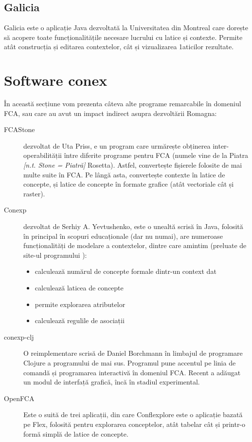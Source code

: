 \documentclass[12pt, a4paper, twoside, romanian]{teza-upb}
\begin{document}
    \subsection{Galicia}
      Galicia este o aplicație Java dezvoltată la Universitatea din Montreal care dorește să acopere toate funcționalitățile necesare lucrului cu latice și contexte. Permite atât construcția și editarea contextelor, cât și vizualizarea 1aticilor rezultate.
  \section{Software conex}

    În această secțiune vom prezenta câteva alte programe remarcabile în domeniul FCA, sau care au avut un impact indirect asupra dezvoltării Romagna:
    \begin{description}
      \item[FCAStone] dezvoltat de Uta Priss, e un program care urmărește obținerea inter-operabilității între diferite programe pentru FCA (numele vine de la Piatra \textit{[n.t. Stone = Piatră]} Rosetta). Astfel, convertește fișierele folosite de mai multe suite în FCA. Pe lângă asta, convertește contexte în latice de concepte, și latice de concepte în formate grafice (atât vectoriale cât și raster).
      \item[Conexp] dezvoltat de Serhiy A. Yevtushenko, este o unealtă scrisă în Java, folosită în principal în scopuri educaționale (dar nu numai), are numeroase funcționalități de modelare a contextelor, dintre care amintim (preluate de site-ul programului \cite{conexp:users}):
        \begin{itemize}
            \item calculează numărul de concepte formale dintr-un context dat
            \item calculează laticea de concepte
            \item permite explorarea atributelor
            \item calculează regulile de asociații
        \end{itemize}
      \item[conexp-clj] O reimplementare scrisă de Daniel Borchmann în limbajul de programare Clojure a programului de mai sus. Programul pune accentul pe linia de comandă și programarea interactivă în domeniul FCA. Recent a adăugat un modul de interfață grafică, încă în stadiul experimental.
      \item[OpenFCA] Este o suită de trei aplicații, din care Conflexplore este o aplicație bazată pe Flex, folosită pentru explorarea conceptelor, atât tabelar cât și printr-o formă simplă de latice de concepte.  

\end{description}
\end{document}
